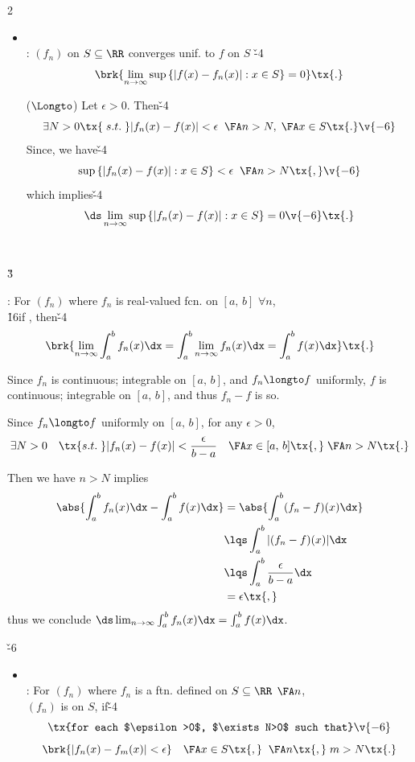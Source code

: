 \documentclass[dvipdfmx,a4paper,titlepage,9pt]{jsarticle}
\begin{document}
\begin{multicols*}{2}
\begin{itemize}[label={-}]
\newpage

\item{} \\
: $(f_n)$ on $S\subseteq\RR$ converges unif. to $f$ on $S$ \v{-4}
$$\brk{\lim_{n\to\infty}\sup{}\{|f(x)-f_n(x)|:x\in S\}=0}\tx{.}$$
\begin{Pfbox}
($\Longto$) Let $\epsilon>0$. Then\v{-4}
$$\exists N>0\tx{\;s.t.\;}|f_n(x)-f(x)|<\epsilon\;\;\FA n>N,\;\FA x\in S\tx{.}\v{-6}$$
Since, we have\v{-4}
$$\sup{}\{|f_n(x)-f(x)|:x\in S\}<\epsilon\;\;\FA n>N\tx{,}\v{-6}$$
which implies\v{-4}
$$\ds\lim_{n\to\infty}\sup{}\{|f_n(x)-f(x)|:x\in S\}=0\v{-6}\tx{.}$$
\end{Pfbox}
\end{itemize}

\; \\


 \v3

: For $(f_n)$ where $f_n$ is real-valued  \!fcn. \!on $[a,\,b]$\; $\forall n$,\\
\h{16}if , then\v{-4}
$$\brk{\lim_{n\to\infty}\int_a^b f_n(x)\dx=\int_a^b\lim_{n\to\infty}f_n(x)\dx=\int_a^b f(x)\dx}\tx{.}$$

\begin{Pfbox}
Since $f_n$ is continuous; integrable on $[a,\,b]$, and $f_n\longto f$ uniformly, $f$ is continuous; integrable on $[a,\,b]$, and thus $f_n-f$ is so.

Since $f_n\longto f$ uniformly on $[a,\,b]$, for any $\epsilon>0$,
$$\exists N>0\quad\tx{s.t.\;}|f_n(x)-f(x)|<\frac{\epsilon}{b-a}\quad \FA x\in[a,\,b]\tx{,}\;\FA n>N\tx{.}$$

Then we have $n>N$ implies
$$\begin{aligned}
  \abs{\int_a^b f_n(x)\dx-\int_a^b f(x)\dx}&=\abs{\int_a^b(f_n-f)(x)\dx} \\
                               &\lqs\int_a^b|(f_n-f)(x)|\dx \\
                               &\lqs\int_a^b\frac{\epsilon}{b-a}\dx \\
                               &=\epsilon\tx{,}
  \end{aligned}$$
thus we conclude $\ds\lim_{n\to\infty}\int_a^b f_n(x)\dx=\int_a^b f(x)\dx$.
\end{Pfbox}

\vfill\null\columnbreak

\v{-6}
\begin{itemize}[label={-}]
\item{} \\
: For $(f_n)$ where $f_n$ is a ftn. \!defined on $S\subseteq\RR$ \;$\FA n$,\\
\;\;$(f_n)$ is  on $S$, if\v{-4}
$$\tx{for each $\epsilon>0$, $\exists N>0$ such that}\v{-6}$$
$$\brk{|f_n(x)-f_m(x)|<\epsilon}\quad \FA x\in S\tx{,}\;\;\FA n\tx{,}\;m>N\tx{.}$$


\end{itemize}
\end{multicols*}
\end{document}

